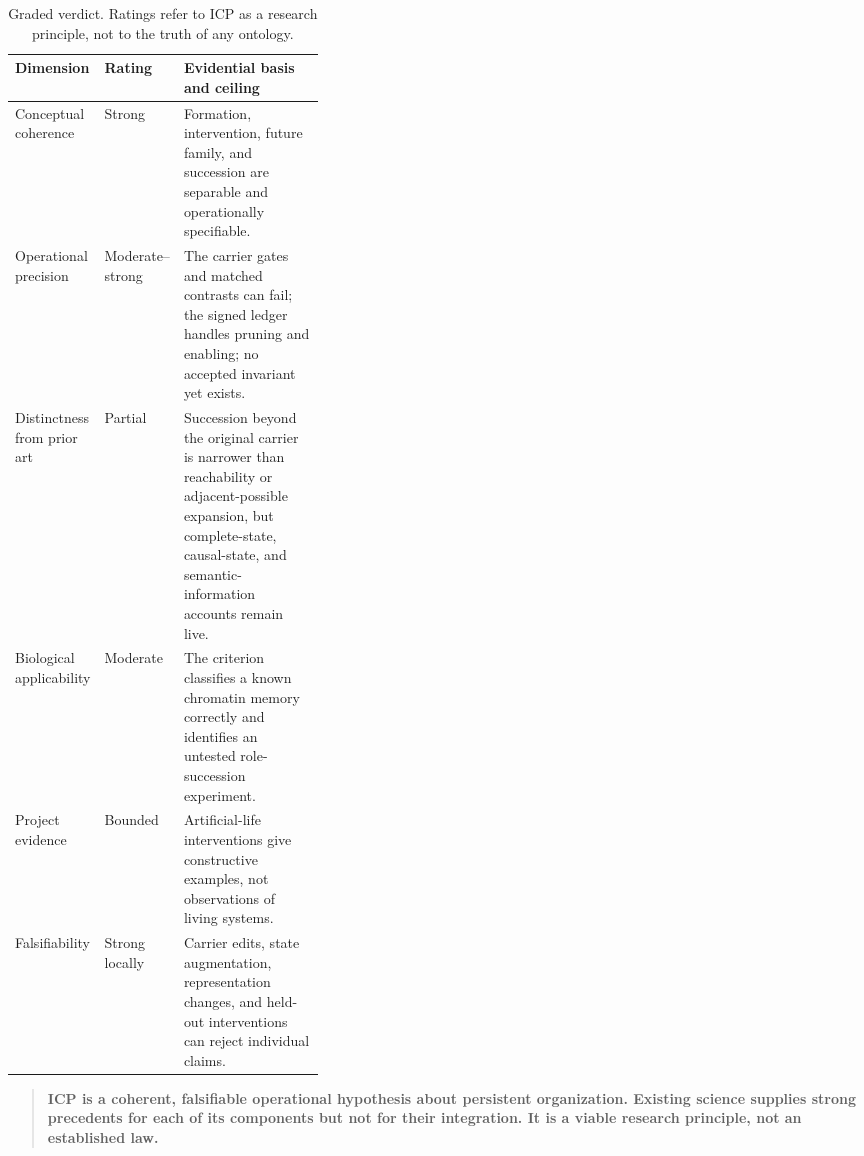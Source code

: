 \begin{table}[ht]
\centering
\small
\caption{Graded verdict. Ratings refer to ICP as a research principle, not to
the truth of any ontology.}
\label{tab:verdict}
\begin{tabularx}{\linewidth}{>{\raggedright\arraybackslash}p{0.21\linewidth}
  >{\raggedright\arraybackslash}p{0.15\linewidth}
  >{\raggedright\arraybackslash}X}
\toprule
Dimension & Rating & Evidential basis and ceiling \\
\midrule
Conceptual coherence & Strong & Formation, intervention, future family, and
succession are separable and operationally specifiable. \\
Operational precision & Moderate--strong & The carrier gates and matched
contrasts can fail; the signed ledger handles pruning and enabling; no accepted
invariant yet exists. \\
Distinctness from prior art & Partial & Succession beyond the original carrier
is narrower than reachability or adjacent-possible expansion, but
complete-state, causal-state, and semantic-information accounts remain live. \\
Biological applicability & Moderate & The criterion classifies a known
chromatin memory correctly and identifies an untested role-succession
experiment. \\
Project evidence & Bounded & Artificial-life interventions give constructive
examples, not observations of living systems. \\
Falsifiability & Strong locally & Carrier edits, state augmentation,
representation changes, and held-out interventions can reject individual
claims. \\
\bottomrule
\end{tabularx}
\end{table}

\begin{quote}
\textbf{ICP is a coherent, falsifiable operational hypothesis about persistent
organization. Existing science supplies strong precedents for each of its
components but not for their integration. It is a viable research principle,
not an established law.}
\end{quote}
